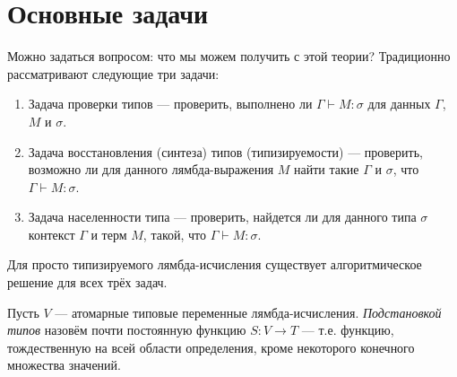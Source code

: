 \section{Основные задачи}

Можно задаться вопросом: что мы можем получить с этой теории?
Традиционно рассматривают следующие три задачи:

\begin{enumerate}
\item Задача проверки типов --- проверить, выполнено ли $\Gamma \vdash M:\sigma$ для
данных $\Gamma$, $M$ и $\sigma$.
\item Задача восстановления (синтеза) типов (типизируемости) --- проверить, возможно ли для
данного лямбда-выражения $M$ найти такие $\Gamma$ и $\sigma$, что $\Gamma \vdash M:\sigma$.
\item Задача населенности типа --- проверить, найдется ли для данного типа $\sigma$ контекст 
$\Gamma$ и терм $M$, такой, что $\Gamma \vdash M:\sigma$.
\end{enumerate}

Для просто типизируемого лямбда-исчисления существует алгоритмическое решение для всех
трёх задач. 

\begin{definition}
Пусть $V$ --- атомарные типовые переменные лямбда-исчисления.  
\emph{Подстановкой типов} назовём почти постоянную функцию $S: V \rightarrow T$ --- т.е. функцию, 
тождественную на всей области определения, кроме некоторого конечного множества значений.
\end{definition}








